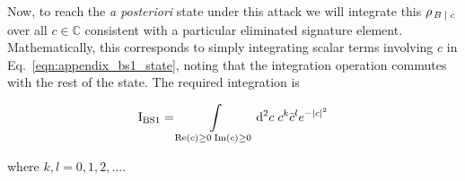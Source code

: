 \iffalse
\begin{align}\label{eqn:qds_bs1_deriv_2}
%
&\tilde{\rho}_B\left(c\right) = \frac{e^{-\left|\alpha_k\right|^2}}{\pi}\left(1 - e^{-\tilde{\beta}}\right) \sum_{n, m, p=0}^\infty \frac{\alpha_k^n \overline{\alpha_k}^m}{\sqrt{n! m!}} e^{- p \tilde{\beta}} \sqrt{n! p! m! p!} \notag \\
%
&\sum_{k_1, k_2, l_1, l_2=0}^{n, p, m, p} \pmqty{n \\ k_1} \pmqty{p \\ k-2} \pmqty{m \\ l_1} \pmqty{p \\ l_2} \left(\sqrt{T}\right)^{k_1 + l_1} \left(\sqrt{1-T}\right)^{n + m - k_1 - l_1} \notag \\
%
&\left(-\sqrt{1-T}\right)^{k_2 + l_2} \left(\sqrt{T}\right)^{2 p - k_2 - l_2} \sqrt{\left(n + p - k_1 - k_2\right)!} \notag \\
%
&\sqrt{\left(m + p - l_1 - l_2\right)!} \dyad{n + p - k_1 - k_2}{m + p - l_1 - l_2} \delta_{k_1+k_2}^{l_1+l_2} \left[ e^{-\left|c\right|^2} c^{k_1 + k_2} \overline{c}^{l_1 + l_2} \right]
%
\end{align}
\fi

Now, to reach the \emph{a posteriori} state under this attack we will integrate this $\rho_{\left. B \; \middle| \; c \right.}$ over all $c \in \mathbb{C}$ consistent with a particular eliminated signature element. Mathematically, this corresponds to simply integrating scalar terms involving $c$ in Eq.~\ref{eqn:appendix_bs1_state}, noting that the integration operation commutes with the rest of the state. The required integration is

\begin{equation}
\text{I}_{\text{BS}1} = \int\limits_{\text{Re}\left(c\right) \ge 0 \; \text{Im}\left(c\right) \ge 0} \mathop{}\!\mathrm{d^2} c \; c^k \bar{c}^l e^{ - \left| c \right|^2}
\end{equation}

\noindent where $k, l = 0, 1, 2, \dots$.

